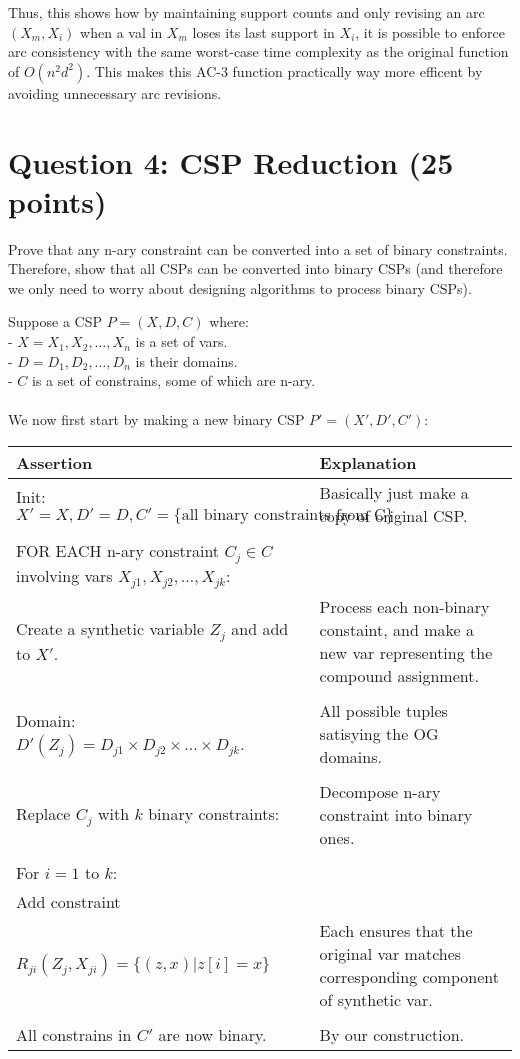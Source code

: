 \documentclass[11pt]{article}
\newcommand{\question}[1]{\section*{\normalsize #1}}
\newenvironment{answercols}
  {\begin{center}\begin{tabular}{p{0.45\textwidth}p{0.45\textwidth}}
   \toprule
   \textbf{Assertion} & \textbf{Explanation} \\
   \midrule}
  {\\ \bottomrule\end{tabular}\end{center}}
\begin{document}
    Thus, this shows how by maintaining support counts and only revising an arc $(X_m, X_i)$ when a val in $X_m$ loses its last support in $X_i$, it is possible to enforce arc consistency with the same worst-case time complexity as the original function of $O(n^2 d^2)$. This makes this AC-3 function practically way more efficent by avoiding unnecessary arc revisions.


    \newpage


    \question{Question 4: CSP Reduction (25 points)}
    Prove that any n-ary constraint can be converted into a set of binary constraints. Therefore, show that all CSPs can be converted into binary CSPs (and therefore we only need to worry about designing algorithms to process binary CSPs).\newline\newline\newline

    \noindent Suppose a CSP $P = (X, D, C)$ where: \\
    - $X = {X_1, X_2, \ldots, X_n}$ is a set of vars.\\
    - $D = {D_1, D_2, \ldots, D_n}$ is their domains.\\
    - $C$ is a set of constrains, some of which are n-ary.\\
    \\
    We now first start by making a new binary CSP $P' = (X', D', C')$: \\
    \begin{answercols}
        Init: $X' = X, D' = D, C' = \{\text{all binary constraints from C}\}$ &
        Basically just make a copy of original CSP. \\
        \\
        FOR EACH n-ary constraint $C_j \in C$ involving vars $X_{j1}, X_{j2}, \ldots, X_{jk}$: \\
        Create a synthetic variable $Z_j$ and add to $X'$. &
        Process each non-binary constaint, and make a new var representing the compound assignment. \\
        \\
        Domain: $D'(Z_j) = D_{j1} \times D_{j2} \times \ldots \times D_{jk}$. &
        All possible tuples satisying the OG domains. \\
        \\
        Replace $C_j$ with $k$ binary constraints: &
        Decompose n-ary constraint into binary ones. \\
        \\
        For $i = 1$ to $k$: \\
        Add constraint \\
        $R_{ji}(Z_j, X_{ji}) = \{(z, x) | z[i] = x\}$ &
        Each ensures that the original var matches corresponding component of synthetic var. \\
        \\
        All constrains in $C'$ are now binary. &
        By our construction.
    \end{answercols}
\end{document}
